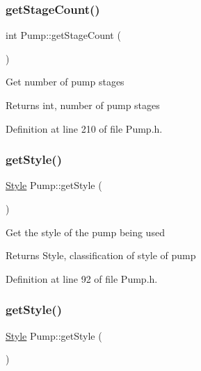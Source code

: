 \subsubsection{\texorpdfstring{get\+Stage\+Count()}{getStageCount()}\hspace{0.1cm}{\footnotesize\ttfamily [3/3]}}
{\footnotesize\ttfamily int Pump\+::get\+Stage\+Count (\begin{DoxyParamCaption}{ }\end{DoxyParamCaption})\hspace{0.3cm}{\ttfamily [inline]}}

Get number of pump stages

\begin{DoxyReturn}{Returns}
int, number of pump stages 
\end{DoxyReturn}


Definition at line 210 of file Pump.\+h.

\mbox{\label{class_pump_ab75d877769b5232c5ab7b4d92940579a}} 
\subsubsection{\texorpdfstring{get\+Style()}{getStyle()}\hspace{0.1cm}{\footnotesize\ttfamily [1/3]}}
{\footnotesize\ttfamily \hyperlink{class_pump_aef354601ce4218258cc898b35a1e90ff}{Style} Pump\+::get\+Style (\begin{DoxyParamCaption}{ }\end{DoxyParamCaption})\hspace{0.3cm}{\ttfamily [inline]}}

Get the style of the pump being used

\begin{DoxyReturn}{Returns}
Style, classification of style of pump 
\end{DoxyReturn}


Definition at line 92 of file Pump.\+h.

\mbox{\label{class_pump_ab75d877769b5232c5ab7b4d92940579a}} 
\subsubsection{\texorpdfstring{get\+Style()}{getStyle()}\hspace{0.1cm}{\footnotesize\ttfamily [2/3]}}
{\footnotesize\ttfamily \hyperlink{class_pump_aef354601ce4218258cc898b35a1e90ff}{Style} Pump\+::get\+Style (\begin{DoxyParamCaption}{ }\end{DoxyParamCaption})\hspace{0.3cm}{\ttfamily [inline]}}


